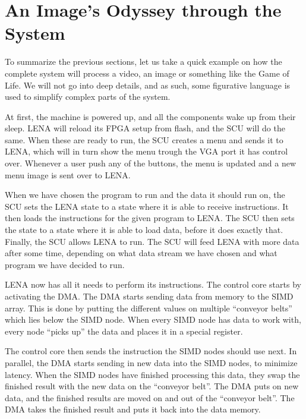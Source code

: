 \section{An Image's Odyssey through the System}

To summarize the previous sections, let us take a quick example on how the
complete system will process a video, an image or something like the Game of
Life. We will not go into deep details, and as such, some figurative language is
used to simplify complex parts of the system.

At first, the machine is powered up, and all the components wake up from their
sleep. \ac{LENA} will reload its \ac{FPGA} setup from flash, and the \ac{SCU}
will do the same. When these are ready to run, the \ac{SCU} creates a menu and
sends it to \ac{LENA}, which will in turn show the menu trough the \ac{VGA} port
it has control over. Whenever a user push any of the buttons, the menu is
updated and a new menu image is sent over to \ac{LENA}.

When we have chosen the program to run and the data it should run on, the
\ac{SCU} sets the \ac{LENA} state to a state where it is able to receive
instructions. It then loads the instructions for the given program to
\ac{LENA}. The \ac{SCU} then sets the state to a state where it is able to load
data, before it does exactly that. Finally, the \ac{SCU} allows \ac{LENA} to run. The
  \ac{SCU} will feed \ac{LENA} with more data after some time, depending on what
  data stream we have chosen and what program we have decided to run.



\ac{LENA} now has all it needs to perform its instructions. The control core
starts by activating the \ac{DMA}. The \ac{DMA} starts sending data from memory
to the \ac{SIMD} array. This is done by putting the different values on multiple
``conveyor belts'' which lies below the \ac{SIMD} node. When every \ac{SIMD}
node has data to work with, every node ``picks up'' the data and places it in a
special register.

The control core then sends the instruction the \ac{SIMD} nodes should use
next. In parallel, the \ac{DMA} starts sending in new data into the \ac{SIMD}
nodes, to minimize latency. When the \ac{SIMD} nodes have finished processing
this data, they swap the finished result with the new data on the ``conveyor
belt''. The \ac{DMA} puts on new data, and the finished results are moved on and
out of the ``conveyor belt''. The \ac{DMA} takes the finished result and puts it
back into the data memory.

